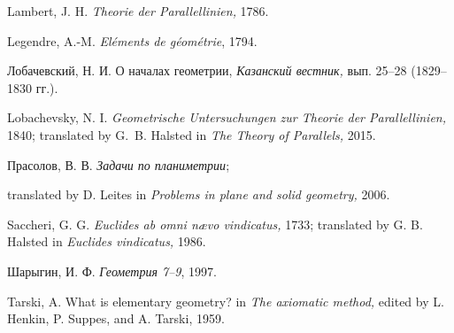 \begin{thebibliography}{52}
Lambert, J. H.
\textit{Theorie der Parallellinien,}
1786.

Legendre, A.-M.
\textit{El\'ements de g\'eom\'etrie}, 1794.

\begin{otherlanguage}{russian}
Лобачевский, Н. И.  
О началах геометрии, 
\textit{Казанский вестник,} вып. 25--28 (1829--1830 гг.).
\end{otherlanguage}

Lobachevsky, N. I.
\textit{Geometrische Untersuchungen zur Theorie der Parallellinien,} 1840;
translated by G.~B. Halsted in \textit{The Theory of Parallels,} 2015.




\begin{otherlanguage}{russian}
Прасолов, В. В. \textit{Задачи по планиметрии};
\end{otherlanguage}
translated by D. Leites in
\textit{Problems in plane and solid geometry,} 
 2006.

Saccheri, G. G.
\textit{Euclides ab omni n\ae vo vindicatus,} 
1733; translated by G. B. Halsted in \textit{Euclides vindicatus,} 1986.


\begin{otherlanguage}{russian}
Шарыгин, И. Ф.
\textit{Геометрия 7--9}, %
1997.
\end{otherlanguage}

 Tarski, A.
What is elementary geometry? in
\textit{The axiomatic method,} edited by L. Henkin, P. Suppes, and A. Tarski,
1959.



\end{thebibliography}
